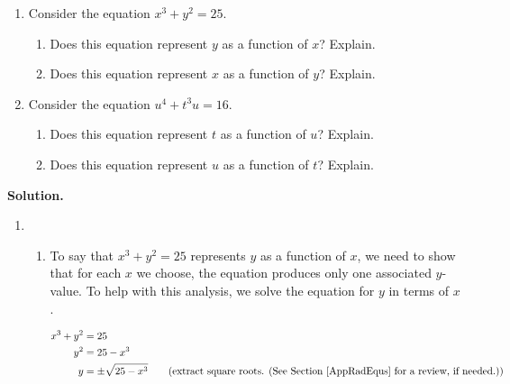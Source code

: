 \begin{ex} \label{equationfunction}   $~$

\begin{enumerate}

\item  Consider the equation $x^{3} + y^{2} = 25$.

\begin{enumerate}

\item Does this equation represent $y$ as a function of $x$?  Explain.

\item Does this equation represent $x$ as a function of $y$?  Explain.

\end{enumerate}

\item Consider the equation $u^{4} + t^{3}u = 16$.  

\begin{enumerate}

\item Does this equation represent $t$ as a function of $u$?  Explain.

\item Does this equation represent $u$ as a function of $t$?  Explain.

\end{enumerate}

\end{enumerate}

{\bf Solution.}

\begin{enumerate}

\item 

\begin{enumerate}

\item  To say that $x^{3} + y^{2} = 25$ represents $y$ as a function of $x$, we need to show that for each $x$ we choose, the equation produces only one associated $y$-value. To help with this analysis, we solve the equation for $y$ in terms of $x$.

\begin{align*}
x^{3} + y^{2}  & = 25 \\
y^{2} & = 25 - x^{3} \\
y & = \pm \sqrt{25 - x^{3}} \tag{extract square roots. (See Section \ref{AppRadEqus} for a review, if needed.)} \\
\end{align*}


\end{enumerate}
\end{enumerate}
\end{ex}
